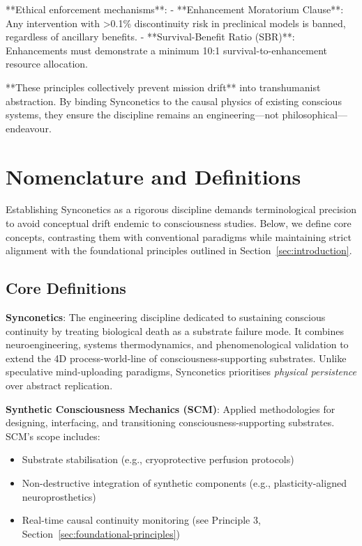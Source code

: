 \documentclass[10pt]{article}
\begin{document}
\begin{sloppypar}
  **Ethical enforcement mechanisms**:
  - **Enhancement Moratorium Clause**: Any intervention with >0.1\% discontinuity risk in preclinical models is banned, regardless of ancillary benefits.
  - **Survival-Benefit Ratio (SBR)**: Enhancements must demonstrate a minimum 10:1 survival-to-enhancement resource allocation.

  **These principles collectively prevent mission drift** into transhumanist abstraction. By binding Synconetics to the causal physics of existing conscious systems, they ensure the discipline remains an engineering—not philosophical—endeavour.

  \section{Nomenclature and Definitions}
  \label{sec:nomenclature}

  Establishing Synconetics as a rigorous discipline demands terminological precision to avoid conceptual drift endemic to consciousness studies. Below, we define core concepts, contrasting them with conventional paradigms while maintaining strict alignment with the foundational principles outlined in Section~\ref{sec:introduction}.

  \subsection{Core Definitions}
  \textbf{Synconetics}: The engineering discipline dedicated to sustaining conscious continuity by treating biological death as a substrate failure mode. It combines neuroengineering, systems thermodynamics, and phenomenological validation to extend the 4D process-world-line of consciousness-supporting substrates. Unlike speculative mind-uploading paradigms, Synconetics prioritises \textit{physical persistence} over abstract replication.

  \textbf{Synthetic Consciousness Mechanics (SCM)}: Applied methodologies for designing, interfacing, and transitioning consciousness-supporting substrates. SCM’s scope includes:
  \begin{itemize}
    \item Substrate stabilisation (e.g., cryoprotective perfusion protocols)
    \item Non-destructive integration of synthetic components (e.g., plasticity-aligned neuroprosthetics)
    \item Real-time causal continuity monitoring (see Principle 3, Section~\ref{sec:foundational-principles})
  \end{itemize}


\end{sloppypar}
\end{document}
